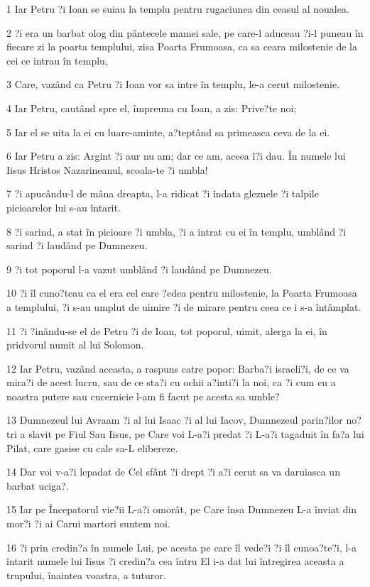 \par 1 Iar Petru ?i Ioan se suiau la templu pentru rugaciunea din ceasul al noualea.
\par 2 ?i era un barbat olog din pântecele mamei sale, pe care-l aduceau ?i-l puneau în fiecare zi la poarta templului, zisa Poarta Frumoasa, ca sa ceara milostenie de la cei ce intrau în templu,
\par 3 Care, vazând ca Petru ?i Ioan vor sa intre în templu, le-a cerut milostenie.
\par 4 Iar Petru, cautând spre el, împreuna cu Ioan, a zis: Prive?te noi;
\par 5 Iar el se uita la ei cu luare-aminte, a?teptând sa primeasca ceva de la ei.
\par 6 Iar Petru a zis: Argint ?i aur nu am; dar ce am, aceea î?i dau. În numele lui Iisus Hristos Nazarineanul, scoala-te ?i umbla!
\par 7 ?i apucându-l de mâna dreapta, l-a ridicat ?i îndata gleznele ?i talpile picioarelor lui s-au întarit.
\par 8 ?i sarind, a stat în picioare ?i umbla, ?i a intrat cu ei în templu, umblând ?i sarind ?i laudând pe Dumnezeu.
\par 9 ?i tot poporul l-a vazut umblând ?i laudând pe Dumnezeu.
\par 10 ?i îl cuno?teau ca el era cel care ?edea pentru milostenie, la Poarta Frumoasa a templului, ?i s-au umplut de uimire ?i de mirare pentru ceea ce i s-a întâmplat.
\par 11 ?i ?inându-se el de Petru ?i de Ioan, tot poporul, uimit, alerga la ei, în pridvorul numit al lui Solomon.
\par 12 Iar Petru, vazând aceasta, a raspuns catre popor: Barba?i israeli?i, de ce va mira?i de acest lucru, sau de ce sta?i cu ochii a?inti?i la noi, ca ?i cum cu a noastra putere sau cucernicie l-am fi facut pe acesta sa umble?
\par 13 Dumnezeul lui Avraam ?i al lui Isaac ?i al lui Iacov, Dumnezeul parin?ilor no?tri a slavit pe Fiul Sau Iisus, pe Care voi L-a?i predat ?i L-a?i tagaduit în fa?a lui Pilat, care gasise cu cale sa-L elibereze.
\par 14 Dar voi v-a?i lepadat de Cel sfânt ?i drept ?i a?i cerut sa va daruiasca un barbat uciga?.
\par 15 Iar pe Începatorul vie?ii L-a?i omorât, pe Care însa Dumnezeu L-a înviat din mor?i ?i ai Carui martori suntem noi.
\par 16 ?i prin credin?a în numele Lui, pe acesta pe care îl vede?i ?i îl cunoa?te?i, l-a întarit numele lui Iisus ?i credin?a cea întru El i-a dat lui întregirea aceasta a trupului, înaintea voastra, a tuturor.
